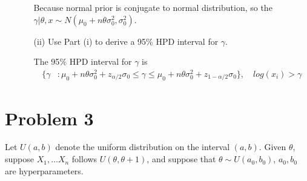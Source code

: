 \begin{itemize}
\begin{itemize}
Because normal prior is conjugate to normal distribution, so the $\gamma  | \theta, x \sim N(\mu_0 +  n\theta \sigma^2_0, \sigma_0^2)$. 

\item[(ii)] Use Part (i) to derive a 95$\%$ HPD interval for $\gamma$.

The 95$\%$ HPD interval for $\gamma$ is 
 \begin{align*}
\Bigg \{\gamma &: \mu_0 +  n\theta \sigma^2_0 + z_{\alpha/2} \sigma_0 \leq \gamma \leq  \mu_0 +  n \theta \sigma^2_0 + z_{1-\alpha/2} \sigma_0  \Bigg \},  \quad log(x_i) > \gamma
\end{align*}

\end{itemize}

\end{itemize}

\section{Problem 3}
Let $U(a, b)$ denote the uniform distribution on the interval $(a, b)$. Given $\theta$, suppose $X_1,…X_n$ follows $U(\theta,\theta+1)$, and suppose that $\theta \sim U(a_0, b_0)$, $a_0, b_0$ are hyperparameters.


